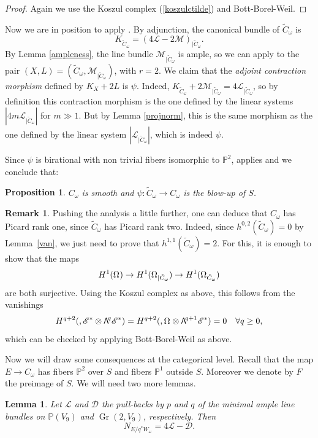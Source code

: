 \documentclass[11pt]{article}
\newcommand{\NoChangel}[1]{%
\expandafter\let\csname old\string#1\endcsname=#1
\let#1=\relax
\newcommand{#1}{\mathcode`l="716C\csname old\string#1\endcsname\mathcode`l="7160 }%
}
\newcommand\bw[1]{{\hbox{\large$\mathsf{\Lambda}$}^{\!#1}}}
\let\mathcal\mathscr
\theoremstyle{plain}
\newtheorem{prop}[theorem]{Proposition}
\newtheorem{lemma}[theorem]{Lemma}
\theoremstyle{definition}
\newtheorem{remark}[theorem]{Remark}
\DeclareMathOperator{\Gr}{Gr}
\DeclareMathOperator{\Fl}{Fl}\NoChangel{\Fl}
\newcommand{\PP}{\mathbb{P}}
\newcommand{\sheaf}[1]{\mathcal{#1}}
\newcommand{\kd}{\sheaf{D}}
\newcommand{\ke}{\sheaf{E}}
\newcommand{\kl}{\sheaf{L}}
\newcommand{\km}{\sheaf{M}}
\begin{document}
\begin{proof}
Again we use the Koszul complex (\ref{koszulctilde}) and Bott-Borel-Weil.\end{proof}

Now we are in position to apply \cite{aw}. By adjunction, the
canonical bundle of $\tilde C_\omega$ is
\[
K_{\tilde C_\omega}=(4\kl-2\km)_{|\tilde C_\omega}.
\]
By Lemma \ref{ampleness}, the line bundle $\km_{|\tilde C_\omega}$ is ample, so we
can apply \cite[Th.\,4.1]{aw} to the pair $(X,L)=(\tilde C_\omega,\km_{|\tilde C_\omega})$,
with $r=2$. We claim that the {\it adjoint contraction morphism} defined by $K_X+2L$ is $\psi$.
Indeed, $K_{\tilde C_\omega}+2\km_{|\tilde C_\omega}=4\kl_{|\tilde C_\omega}$, so by definition
this contraction morphism is the one defined by the linear systems $|4m\kl_{|\tilde C_\omega}|$
for $m\gg1$. But by Lemma \ref{projnorm}, this is the same morphism as the one defined by the
linear system $|\kl_{|\tilde C_\omega}|$, which is indeed $\psi$.

Since $\psi$ is birational with non trivial fibers isomorphic to $\PP^2$, \cite[Th.\,4.1(iii)]{aw}
applies and we conclude that:\enlargethispage{-\baselineskip}%

\begin{prop}\label{blowupS}
$C_\omega$ is smooth and $\psi : \tilde C_\omega \to C_\omega$ is the blow-up of $S$.
\end{prop}

\begin{remark} Pushing the analysis a little further, one can deduce that $C_\omega$ has Picard rank one, since $\tilde C_\omega$ has Picard rank two. Indeed, since $h^{0,2}(\tilde C_\omega)=0$
by Lemma~\ref{van}, we just need to prove that $h^{1,1}(\tilde C_\omega)=2$.
For this, it is enough to show that the maps
\[
H^1(\Omega_{\Fl})\to H^1(\Omega_{{\Fl}|\tilde C_\omega})\to H^1(\Omega_{\tilde C_\omega})
\]
are both surjective. Using the Koszul complex as above, this follows from the vanishings
\[
H^{q+2}({\Fl}, \ke^*\otimes \bw{q}\ke^*)=H^{q+2}({\Fl}, \Omega_{\Fl}\otimes \bw{q+1}\ke^*)=0 \quad \forall q\ge 0,
\]
which can be checked by applying Bott-Borel-Weil as above.
\end{remark}

Now we will draw some consequences at the categorical level. Recall that the map $E\to C_\omega$
has fibers $\PP^2$ over $S$ and fibers $\PP^1$ outside $S$. Moreover we denote by $F$ the preimage
of $S$. We will need two more lemmas.

\begin{lemma}\label{normalE}
Let $\kl$ and $\kd$ the pull-backs by $p$ and $q$ of the minimal ample line bundles on $\PP(V_9)$ and $\Gr(2,V_9)$, respectively. Then
\[
N_{E/q^* W_\omega}=4\kl-\kd .
\]
\end{lemma}
\end{document}
